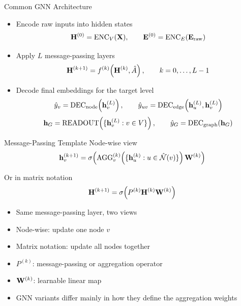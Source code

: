 \documentclass[10pt,aspectratio=169]{ntuabeamer}
\begin{document}

\begin{frame}{Common GNN Architecture}
  \small
  \begin{itemize}
    \item Encode raw inputs into hidden states
    \[
      \mathbf{H}^{(0)} = \operatorname{ENC}_{V}(\mathbf{X}),
      \qquad
      \mathbf{E}^{(0)} = \operatorname{ENC}_{E}\!\left(\mathbf{E}_{\mathrm{raw}}\right)
    \]
    \item Apply \(L\) message-passing layers
    \[
      \mathbf{H}^{(k+1)} = f^{(k)}\!\left(\mathbf{H}^{(k)}, \hat{A}\right),
      \qquad k = 0, \dots, L-1
    \]
    \item Decode final embeddings for the target level
    \[
      \hat{y}_{v} = \operatorname{DEC}_{\mathrm{node}}\!\left(\mathbf{h}_{v}^{(L)}\right),
      \qquad
      \hat{y}_{uv} =
      \operatorname{DEC}_{\mathrm{edge}}\!\left(\mathbf{h}_{u}^{(L)}, \mathbf{h}_{v}^{(L)}\right)
    \]
    \[
      \mathbf{h}_{G} = \operatorname{READOUT}\!\left(\{\mathbf{h}_{v}^{(L)} : v \in V\}\right),
      \qquad
      \hat{y}_{G} = \operatorname{DEC}_{\mathrm{graph}}\!\left(\mathbf{h}_{G}\right)
    \]
  \end{itemize}
\end{frame}

\begin{frame}{Message-Passing Template}
  \textcolor{ntuablue}{Node-wise view}
  \[
    \mathbf{h}_{v}^{(k+1)} =
    \sigma\!\left(
      \operatorname{AGG}_{v}^{(k)}\!\left(\{\mathbf{h}_{u}^{(k)} : u \in \hat{\mathcal N}(v)\}\right)
      \mathbf{W}^{(k)}
    \right)
  \]

  \textcolor{ntuablue}{Or in matrix notation}
  \[
    \mathbf{H}^{(k+1)} =
    \sigma\!\left(P^{(k)} \mathbf{H}^{(k)} \mathbf{W}^{(k)}\right)
  \]

  \begin{itemize}
    \item Same message-passing layer, two views
    \item Node-wise: update one node \(v\)
    \item Matrix notation: update all nodes together
    \item \(P^{(k)}\): message-passing or aggregation operator
    \item \(\mathbf{W}^{(k)}\): learnable linear map
    \item GNN variants differ mainly in how they define the aggregation weights
  \end{itemize}
\end{frame}
\end{document}
